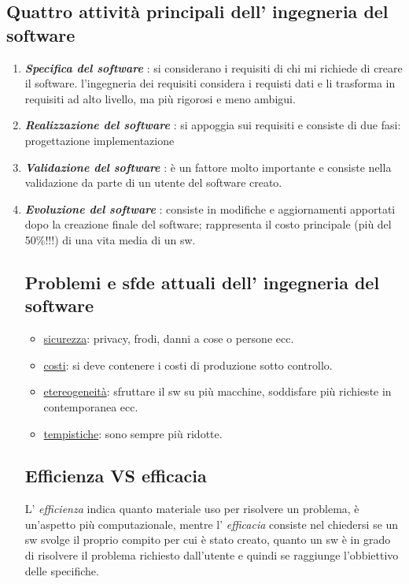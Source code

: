 \documentclass[a4paper, 10pt]{article}
\begin{document}
	\subsection{Quattro attività principali dell' ingegneria del software}
	\begin{enumerate}
		\item \textbf{\textit{Specifica del software}} : si considerano i requisiti di chi mi richiede di
		creare il software.
		\subitem{-} l'ingegneria dei requisiti considera i requisti dati e li trasforma in
		requisiti ad alto livello, ma più rigorosi e meno ambigui.
		\item \textbf{\textit{Realizzazione del software}} : si appoggia sui requisiti e consiste di due fasi:
		\subitem{-} progettazione
		\subitem{-} implementazione
		\item \textbf{\textit{Validazione del software}} : è un fattore molto importante e consiste nella
		validazione da parte di un utente del software creato.
		\item \textbf{\textit{Evoluzione del software}} : consiste in modifiche e aggiornamenti apportati
		dopo la creazione finale del software; rappresenta il costo principale
		(più del 50\%!!!) di una vita media di un sw.
		
	\subsection*{Problemi e sfde attuali dell' ingegneria del software}
		
		\begin{itemize}
			\item \underline{sicurezza}: privacy, frodi, danni a cose o persone ecc.
			\item \underline{costi}: si deve contenere i costi di produzione sotto controllo.
			\item \underline{etereogeneità}: sfruttare il sw su più macchine, soddisfare più richieste in
			contemporanea ecc.
			\item \underline{tempistiche}: sono sempre più ridotte.
		\end{itemize}
		
	\subsection{Efficienza VS efficacia}
		L' \textit{efficienza} indica quanto materiale uso per risolvere un problema, è un'aspetto più computazionale, mentre l' \textit{efficacia} consiste nel chiedersi se un sw svolge il proprio compito per cui è stato creato, quanto un sw è in grado di risolvere il problema richiesto dall'utente e quindi se raggiunge l'obbiettivo delle specifiche.
		

\end{enumerate}
\end{document}
